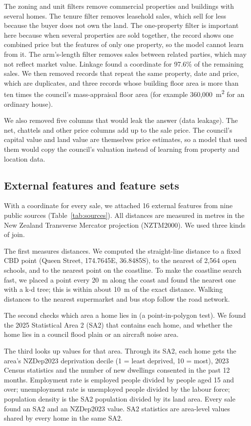 \documentclass[conference]{IEEEtran}
\begin{document}
The zoning and unit filters remove commercial properties and buildings
with several homes. The tenure filter removes leasehold sales, which sell
for less because the buyer does not own the land. The one-property
filter is important here because when several properties are sold
together, the record shows one combined price but the features of only
one property, so the model cannot learn from it. The arm's-length filter
removes sales between related parties, which may not reflect market
value. Linkage found a coordinate for 97.6\% of the remaining sales. We
then removed records that repeat the same property, date and price,
which are duplicates, and three records whose building floor area is
more than ten times the council's mass-appraisal floor area (for example
360,000~m\textsuperscript{2} for an ordinary house).

We also removed five columns that would leak the answer (data leakage).
The net, chattels and other price columns add up to the sale price. The
council's capital value and land value are themselves price estimates,
so a model that used them would copy the council's valuation instead of
learning from property and location data.

\subsection{External features and feature sets}\label{sec:external}
With a coordinate for every sale, we attached 16 external features from
nine public sources (Table~\ref{tab:sources}). All distances are
measured in metres in the New Zealand Transverse Mercator projection
(NZTM2000). We used three kinds of join.

The first measures distances. We computed the straight-line distance to
a fixed CBD point (Queen Street, 174.7645\textdegree E,
36.8485\textdegree S), to the nearest of 2,564 open schools, and to the
nearest point on the coastline. To make the coastline search fast, we
placed a point every 20~m along the coast and found the nearest one with
a k-d tree; this is within about 10~m of the exact distance. Walking
distances to the nearest supermarket and bus stop follow the road
network.

The second checks which area a home lies in (a point-in-polygon test).
We found the 2025 Statistical Area 2 (SA2) that contains each home, and
whether the home lies in a council flood plain or an aircraft noise
area.

The third looks up values for that area. Through its SA2, each home gets
the area's NZDep2023 deprivation decile (1 = least deprived, 10 = most),
2023 Census statistics and the number of new dwellings consented in the
past 12 months. Employment rate is employed people divided by people
aged 15 and over; unemployment rate is unemployed people divided by the
labour force; population density is the SA2 population divided by its
land area. Every sale found an SA2 and an NZDep2023 value. SA2 statistics are
area-level values shared by every home in the same SA2.
\end{document}
